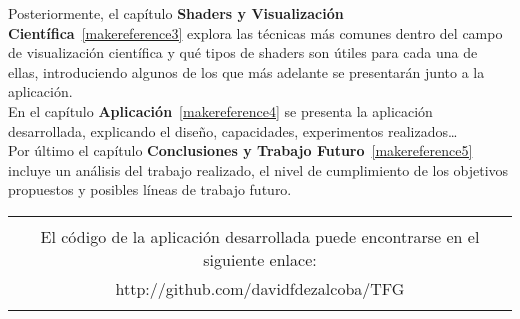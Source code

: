 Posteriormente, el capítulo \textbf{Shaders y Visualización
Científica}~\ref{makereference3} explora las técnicas más comunes dentro del
campo de visualización científica y qué tipos de shaders son útiles para cada
una de ellas, introduciendo algunos de los que más adelante se presentarán junto
a la aplicación.\\

En el capítulo \textbf{Aplicación}~\ref{makereference4} se presenta la
aplicación desarrollada, explicando el diseño, capacidades, experimentos
realizados\ldots\\

Por último el capítulo \textbf{Conclusiones y Trabajo
Futuro}~\ref{makereference5} incluye un análisis del trabajo realizado, el nivel
de cumplimiento de los objetivos propuestos y posibles líneas de trabajo
futuro.\\

\begin{table}[b]
		\begin{tabular}[b]{|c|}
			\hline
			\\
			El código de la aplicación desarrollada puede encontrarse en el
			siguiente enlace:\\
			http://github.com/davidfdezalcoba/TFG\\
			\\
			\hline
		\end{tabular}
\end{table}

% 
% 
% 
% 


